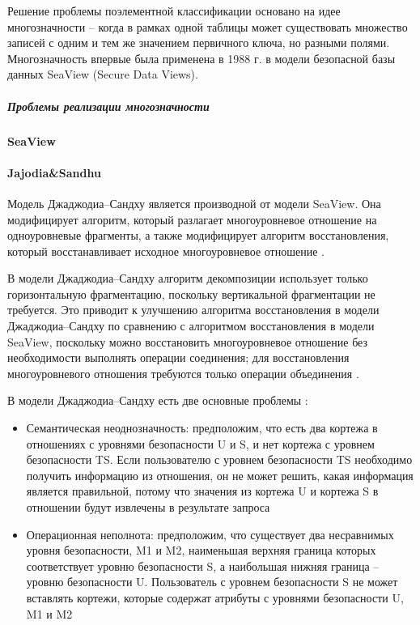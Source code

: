 Решение проблемы поэлементной классификации основано на идее многозначности --  когда в рамках одной таблицы может существовать множество записей с одним и тем же значением первичного ключа, но разными полями.  Многозначность впервые была применена в 1988 г. в модели безопасной базы данных SeaView (Secure Data Views).  

\subparagraph{Проблемы реализации многозначности}


\paragraph{SeaView}


\paragraph{Jajodia\&Sandhu}

Модель Джаджодиа–Сандху является производной от модели SeaView. Она модифицирует алгоритм, который разлагает 
многоуровневое отношение на одноуровневые фрагменты, а также модифицирует алгоритм восстановления, который 
восстанавливает исходное многоуровневое отношение \autocite{Osama}.

В модели Джаджодиа–Сандху алгоритм декомпозиции использует только горизонтальную фрагментацию, поскольку 
вертикальной фрагментации не требуется. Это приводит к улучшению алгоритма восстановления в модели Джаджодиа–Сандху 
по сравнению с алгоритмом восстановления в модели SeaView, поскольку можно восстановить многоуровневое отношение 
без необходимости выполнять операции соединения; для восстановления многоуровневого отношения требуются только 
операции объединения \autocite{Osama}.

В модели Джаджодиа–Сандху есть две основные проблемы \autocite{Osama}:
\begin{itemize}
    \item Семантическая неоднозначность: предположим, что есть два кортежа в отношениях с уровнями безопасности 
    U и S, и нет кортежа с уровнем безопасности TS. Если пользователю с уровнем безопасности TS необходимо 
    получить информацию из отношения, он не может решить, какая информация является правильной, потому что 
    значения из кортежа U и кортежа S в отношении будут извлечены в результате запроса
    \item Операционная неполнота: предположим, что существует два несравнимых уровня безопасности, M1 и M2, 
    наименьшая верхняя граница которых соответствует уровню безопасности S, а наибольшая нижняя граница -- 
    уровню безопасности U. Пользователь с уровнем безопасности S не может вставлять кортежи, которые содержат 
    атрибуты с уровнями безопасности U, M1 и M2
\end{itemize}


